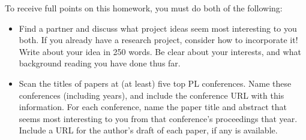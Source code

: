 \documentclass[11pt]{article}
\begin{document}
\begin{enumerate}
To receive full points on this homework, you must do both of the following:

\begin{itemize}

\item Find a partner and discuss what project ideas seem most
  interesting to you both.
If you already have a research project, consider how to incorporate it!
%
Write about your idea in 250 words.
%
Be clear about your interests, and what background reading you have done thus far.

\item Scan the titles of papers at (at least) five top PL conferences.
%
Name these conferences (including years), and include the conference
URL with this information.
%
For each conference, name the paper title and abstract that seems most
interesting to you from that conference's proceedings that year.
%
Include a URL for the author's draft of each paper, if any is available.
\end{itemize}

\end{enumerate}
\end{document}
